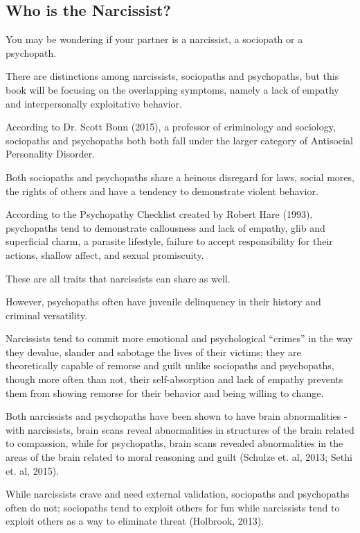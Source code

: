 \documentclass[oneside]{book}
\numberwithin{equation}{section}
\begin{document}
\subsection{Who is the Narcissist?}
You may be wondering if your partner is a narcissist, a sociopath or a psychopath.

There are distinctions among narcissists, sociopaths and psychopaths, but this book will be focusing on the overlapping symptoms, namely a lack of empathy and interpersonally exploitative behavior.

According to Dr. Scott Bonn (2015), a professor of criminology and sociology, sociopaths and psychopaths both both fall under the larger category of Antisocial Personality Disorder.

Both sociopaths and psychopaths share a heinous disregard for laws, social mores, the rights of others and have a tendency to demonstrate violent behavior.

According to the Psychopathy Checklist created by Robert Hare (1993), psychopaths tend to demonstrate callousness and lack of empathy, glib and superficial charm, a parasite lifestyle, failure to accept responsibility for their actions, shallow affect, and sexual promiscuity.

These are all traits that narcissists can share as well.

%
However, psychopaths often have juvenile delinquency in their history and criminal versatility.

Narcissists tend to commit more emotional and psychological ``crimes'' in the way they devalue, slander and sabotage the lives of their victims; they are theoretically capable of remorse and guilt unlike sociopaths and psychopaths, though more often than not, their self-absorption and lack of empathy prevents them from showing remorse for their behavior and being willing to change.

Both narcissists and psychopaths have been shown to have brain abnormalities - with narcissists, brain scans reveal abnormalities in structures of the brain related to compassion, while for psychopaths, brain scans revealed abnormalities in the areas of the brain related to moral reasoning and guilt (Schulze et. al, 2013; Sethi et. al, 2015).

%
While narcissists crave and need external validation, sociopaths and psychopaths often do not; sociopaths tend to exploit others for fun while narcissists tend to exploit others as a way to eliminate threat (Holbrook, 2013).
\end{document}
